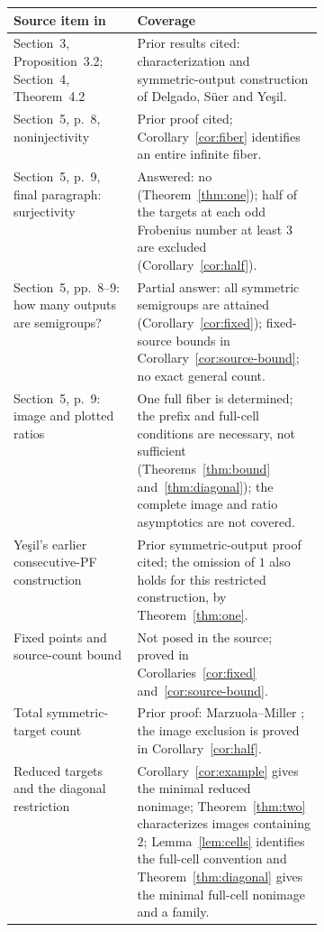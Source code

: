 \documentclass[11pt,a4paper]{article}
\theoremstyle{definition}
\theoremstyle{remark}
\begin{document}
\smallskip
\begingroup\small
\noindent\begin{tabularx}{\linewidth}{@{}p{0.40\linewidth}X@{}}
\toprule
Source item in \cite{DSY} & Coverage \\
\midrule
Section~3, Proposition~3.2; Section~4, Theorem~4.2 & Prior results cited:
characterization and symmetric-output construction of Delgado, S\"uer and Ye\c{s}il. \\
Section~5, p.~8, noninjectivity & Prior proof cited; Corollary~\ref{cor:fiber}
identifies an entire infinite fiber. \\
Section~5, p.~9, final paragraph: surjectivity & Answered: no
(Theorem~\ref{thm:one}); half of the targets at each odd Frobenius number
at least $3$ are excluded (Corollary~\ref{cor:half}). \\
Section~5, pp.~8--9: how many outputs are semigroups? & Partial answer:
all symmetric semigroups are attained (Corollary~\ref{cor:fixed});
fixed-source bounds in Corollary~\ref{cor:source-bound}; no exact general count. \\
Section~5, p.~9: image and plotted ratios & One full fiber is determined;
the prefix and full-cell conditions are necessary, not sufficient (Theorems~\ref{thm:bound} and~\ref{thm:diagonal}); the complete image and ratio asymptotics are not covered. \\
Ye\c{s}il's earlier consecutive-PF construction \cite[Lemma~5.7]{Y} &
Prior symmetric-output proof cited; the omission of $1$ also holds for this
restricted construction, by Theorem~\ref{thm:one}. \\
Fixed points and source-count bound & Not posed in the source;
proved in Corollaries~\ref{cor:fixed} and~\ref{cor:source-bound}. \\
Total symmetric-target count & Prior proof: Marzuola--Miller
\cite[p.~12]{MM}; the image exclusion is proved in Corollary~\ref{cor:half}. \\
Reduced targets and the diagonal restriction &
Corollary~\ref{cor:example} gives the minimal reduced nonimage;
Theorem~\ref{thm:two} characterizes images containing $2$;
Lemma~\ref{lem:cells} identifies the full-cell convention and
Theorem~\ref{thm:diagonal} gives the minimal full-cell nonimage and a family. \\
\bottomrule
\end{tabularx}
\endgroup
\end{document}
